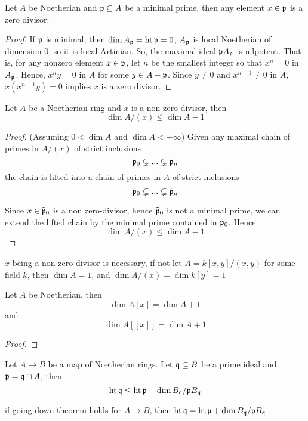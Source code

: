 \begin{lemma}
	Let $A$ be Noetherian and $\mathfrak{p} \subseteq A$ be a minimal prime, then any element $x \in \mathfrak{p}$ is a zero divisor.
\end{lemma}

\begin{proof}
	If $\mathfrak{p}$ is minimal, then $\dim A_{\mathfrak{p}} = \operatorname{ht} \mathfrak{p} = 0$, $A_{\mathfrak{p}}$ is local Noetherian of dimension $0$, so it is local Artinian. So, the maximal ideal $\mathfrak{p} A_{\mathfrak{p}}$ is nilpotent. That is, for any nonzero element $x \in \mathfrak{p}$, let $n$ be the smallest integer so that $x^n = 0$ in $A_{\mathfrak{p}}$. Hence, $x^n y = 0$ in $A$ for some $y \in A - \mathfrak{p}$. Since $y \neq 0$ and $x^{n-1} \neq 0$ in $A$, $x (x^{n-1} y) = 0$ implies $x$ is a zero divisor.
\end{proof}

\begin{theorem}
	Let $A$ be a Noetherian ring and $x$ is a non zero-divisor, then 
	$$
	\dim A / (x) \leq \dim A - 1
	$$
\end{theorem}

\begin{proof}
	(Assuming $0 < \dim A$ and $\dim A < +\infty$) Given any maximal chain of primes in $A / (x)$ of strict inclusions
	$$
	\mathfrak{p}_0 \subsetneq ... \subsetneq \mathfrak{p}_n
	$$
	the chain is  lifted into a chain of primes in $A$ of strict inclusions
	$$
	\tilde{\mathfrak{p}}_0 \subsetneq ... \subsetneq \tilde{\mathfrak{p}}_n
	$$
	
	Since $x \in \tilde{\mathfrak{p}}_0$ is a non zero-divisor, hence $\tilde{\mathfrak{p}}_0$ is not a minimal prime, we can extend the lifted chain by the minimal prime contained in $\tilde{\mathfrak{p}}_0$. Hence
	$$
	\dim A / (x) \leq \dim A - 1
	$$
\end{proof}

\begin{remark}
	$x$ being a non zero-divisor is necessary, if not let $A = k[x, y] / (x, y)$ for some field $k$, then $\dim A = 1$, and $\dim A / (x) = \dim k[y] = 1$
\end{remark}

\begin{theorem}
	Let $A$ be Noetherian, then
	$$
		\dim A[x] = \dim A + 1
	$$
	and
	$$
		\dim A[[x]] = \dim A + 1
	$$
\end{theorem}

\begin{proof}
\end{proof}

\begin{theorem}
	Let $A \to B$ be a map of Noetherian rings. Let $\mathfrak{q} \subseteq B$ be a prime ideal and $\mathfrak{p} = \mathfrak{q} \cap A$, then
	$$
		\operatorname{ht} \mathfrak{q} \leq \operatorname{ht} \mathfrak{p} + \dim B_{\mathfrak{q}} / \mathfrak{p} B_{\mathfrak{q}}
	$$
	
	if going-down theorem holds for $A \to B$, then $\operatorname{ht} \mathfrak{q} = \operatorname{ht} \mathfrak{p} + \dim B_{\mathfrak{q}} / \mathfrak{p} B_{\mathfrak{q}}$
\end{theorem}

